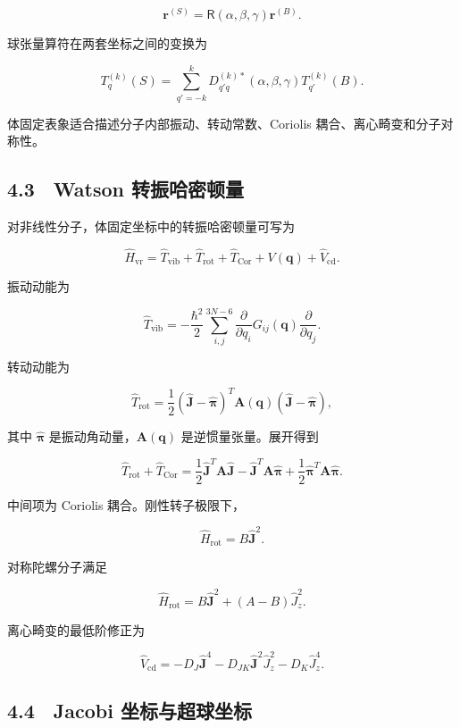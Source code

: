 \documentclass[
  a4paper,
]{ctexbook}
\begin{document}
\[
\mathbf{r}^{(S)}
=
\mathsf{R}(\alpha,\beta,\gamma)\mathbf{r}^{(B)}.
\]

球张量算符在两套坐标之间的变换为

\[
T^{(k)}_q(S)
=
\sum_{q'=-k}^{k}
D^{(k)*}_{q'q}(\alpha,\beta,\gamma)
T^{(k)}_{q'}(B).
\]

体固定表象适合描述分子内部振动、转动常数、Coriolis
耦合、离心畸变和分子对称性。

\hypertarget{watson-ux8f6cux632fux54c8ux5bc6ux987fux91cf}{%
\subsection{4.3　Watson
转振哈密顿量}\label{watson-ux8f6cux632fux54c8ux5bc6ux987fux91cf}}

对非线性分子，体固定坐标中的转振哈密顿量可写为

\[
\hat H_{\mathrm{vr}}
=
\hat T_{\mathrm{vib}}
+
\hat T_{\mathrm{rot}}
+
\hat T_{\mathrm{Cor}}
+
V(\mathbf q)
+
\hat V_{\mathrm{cd}}.
\]

振动动能为

\[
\hat T_{\mathrm{vib}}
=
-\frac{\hbar^2}{2}
\sum_{i,j}^{3N-6}
\frac{\partial}{\partial q_i}
G_{ij}(\mathbf q)
\frac{\partial}{\partial q_j}.
\]

转动动能为

\[
\hat T_{\mathrm{rot}}
=
\frac12
(\hat{\mathbf J}-\hat{\boldsymbol{\pi}})^T
\mathbf A(\mathbf q)
(\hat{\mathbf J}-\hat{\boldsymbol{\pi}}),
\]

其中 \(\hat{\boldsymbol{\pi}}\) 是振动角动量，\(\mathbf A(\mathbf q)\)
是逆惯量张量。展开得到

\[
\hat T_{\mathrm{rot}}
+
\hat T_{\mathrm{Cor}}
=
\frac12
\hat{\mathbf J}^T\mathbf A\hat{\mathbf J}
-
\hat{\mathbf J}^T\mathbf A\hat{\boldsymbol{\pi}}
+
\frac12
\hat{\boldsymbol{\pi}}^T\mathbf A\hat{\boldsymbol{\pi}}.
\]

中间项为 Coriolis 耦合。刚性转子极限下，

\[
\hat H_{\mathrm{rot}}=B\hat{\mathbf J}^2.
\]

对称陀螺分子满足

\[
\hat H_{\mathrm{rot}}
=
B\hat{\mathbf J}^2
+
(A-B)\hat J_z^2.
\]

离心畸变的最低阶修正为

\[
\hat V_{\mathrm{cd}}
=
-D_J\hat{\mathbf J}^4
-
D_{JK}\hat{\mathbf J}^2\hat J_z^2
-
D_K\hat J_z^4.
\]

\hypertarget{jacobi-ux5750ux6807ux4e0eux8d85ux7403ux5750ux6807}{%
\subsection{4.4　Jacobi
坐标与超球坐标}\label{jacobi-ux5750ux6807ux4e0eux8d85ux7403ux5750ux6807}}
\end{document}
